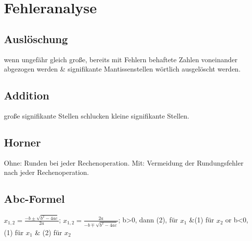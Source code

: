 \section{Fehleranalyse}
\subsection{Auslöschung}
wenn ungefähr gleich große, bereits mit Fehlern behaftete Zahlen voneinander abgezogen werden \& signifikante Mantissenstellen wörtlich ausgelöscht werden.
\subsection{Addition}
große signifikante Stellen schlucken kleine signifikante Stellen.
\subsection{Horner}
Ohne: Runden bei jeder Rechenoperation. Mit: Vermeidung der Rundungsfehler nach jeder Rechenoperation.
\subsection{Abc-Formel}
$ x_{1,2} = \frac{-b \pm \sqrt{b^2 - 4ac}}{2a} $; 
$ x_{1,2} = \frac{2a}{-b \mp \sqrt{b^2 -4ac}} $; 
b>0, dann (2), für $ x_1 $ \&(1) für $ x_2 $ or 
b<0, (1) für $x_{1} $ \& (2) für $ x_2 $
